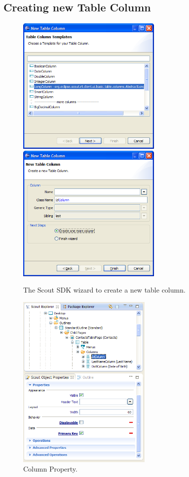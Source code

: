 \documentclass[a4paper,10pt,twoside]{book}
\begin{document}
\subsection{Creating new Table Column}

\begin{figure}
\includegraphics[width=7cm]{wizard_column_1.png} \hspace{5mm}
\includegraphics[width=7cm]{wizard_column_2.png}
\caption{The Scout SDK wizard to create a new table column.}
\end{figure}

\begin{figure}
\includegraphics[width=6.5cm]{wizard_column_explorer_properties.png}
\caption{Column Property.}
\end{figure}
\end{document}
